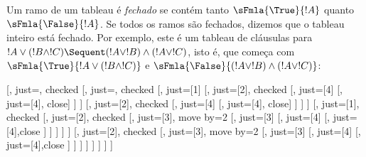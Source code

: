 \documentclass[../../../include/open-logic-section]{subfiles}
\begin{document}
Um ramo de um tableau é \emph{fechado} se contém tanto
$\sFmla{\True}{!A}$ quanto $\sFmla{\False}{!A}$. Se todos os ramos são
fechados, dizemos que o tableau inteiro está fechado. Por exemplo, este
é um tableau de cláusulas para $!A \lor (!B \land !C) \Sequent (!A \lor
!B) \land (!A \lor !C)$, isto é, que começa com
$\sFmla{\True}{!A \lor (!B \land !C)}$ e
$\sFmla{\False}{(!A \lor !B) \land (!A \lor !C)}$:
\begin{maxwidth}
  \begin{tableau}{}
  [,
    just=\TAss, checked
    [, just=\TAss, checked
      [, just={\TRule{\True}{\lor}[1]}
        [,
          just={\TRule{\False}{\land}[2]}, checked
          [,
            just={\TRule{\False}{\lor}[4]}
            [,
              just={\TRule{\False}{\lor}[4]}, close]
          ]
        ]
        [,
          just={\TRule{\False}{\land}[2]}, checked
          [,
            just={\TRule{\False}{\lor}[4]}
            [,
              just={\TRule{\False}{\lor}[4]}, close]
          ]
        ]
      ]
      [,
        just={\TRule{\True}{\lor}[1]}, checked
        [,
          just={\TRule{\False}{\land}[2]}, checked
          [,
            just={\TRule{\True}{\land}[3]}, move by=2
            [,
              just={\TRule{\True}{\land}[3]}
              [,
                just={\TRule{\False}{\lor}[4]}
                [,
                  just={\TRule{\False}{\lor}[4]},close
                ]
              ]
            ]
          ]
        ]
        [,
          just={\TRule{\False}{\land}[2]}, checked
          [,
            just={\TRule{\True}{\land}[3]}, move by=2
              [,
                just={\TRule{\True}{\land}[3]}
                [,
                  just={\TRule{\False}{\lor}[4]}
                  [,
                  just={\TRule{\False}{\lor}[4]},close
                ]
              ]
            ]
          ]
        ]
      ]
    ]
  ]
\end{tableau}
\end{maxwidth}
\end{document}
